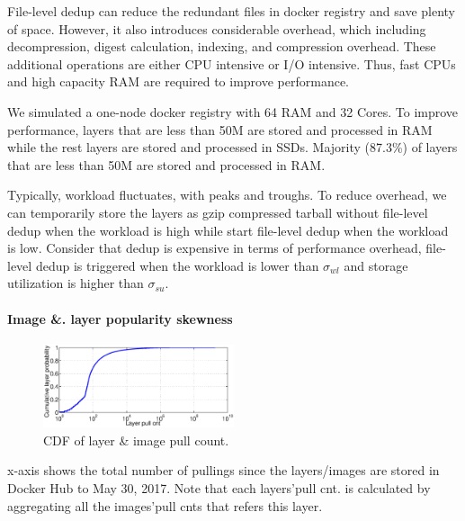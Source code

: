 File-level dedup can reduce the redundant files in docker registry and save plenty of space. However, it also introduces considerable overhead, which including decompression, digest calculation, indexing, and compression overhead. These additional operations are either CPU intensive or I/O intensive. Thus, fast CPUs and high capacity RAM are required to improve performance.

We simulated a one-node docker registry with 64 RAM and 32 Cores. 
To improve performance, layers that are less than 50M are stored and processed in RAM while the rest layers are stored and processed in SSDs. Majority (87.3\%) of layers that are less than 50M are stored and processed in RAM.

Typically, workload fluctuates, with peaks and troughs. To reduce overhead, we can temporarily store the layers as gzip compressed tarball without file-level dedup when the workload is high while start file-level dedup when the workload is low. Consider that dedup is expensive in terms of performance overhead, file-level dedup is triggered when the workload is lower than $\sigma_{wl}$ and storage utilization is higher than $\sigma_{su}$.

\paragraph{Image \&. layer popularity skewness} 


\begin{figure}
	\centering
	\includegraphics[width=0.5\textwidth]{graphs/pull_cnt.eps}
	\caption{CDF of layer \& image pull count.
	}
	\label{fig:pull-cnt}
\end{figure}

x-axis shows the total number of pullings since the layers/images are stored in Docker Hub to May 30, 2017. Note that each layers'pull cnt. is calculated by aggregating all the images'pull cnts that refers this layer.

